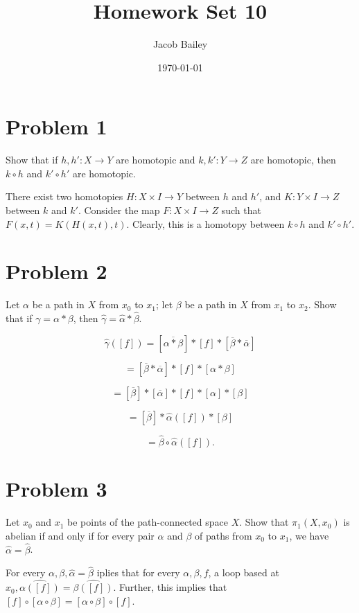 \documentclass[11pt]{article}
\author{Jacob Bailey}
\date{\today}
\title{Homework Set 10}
\begin{document}
\maketitle
\section{Problem 1}
\label{sec:orgf0c4a9f}
Show that if \(h, h': X\rightarrow Y\) are homotopic and \(k, k':Y\rightarrow Z\)
are homotopic, then \(k\circ h\) and \(k'\circ h'\) are homotopic.

There exist two homotopies \(H: X\times I\rightarrow Y\) between \(h\) and \(h'\), and
\(K:Y\times I\rightarrow Z\) between \(k\) and \(k'\). Consider the map \(F: X\times
I\rightarrow Z\) such that \(F(x,t) = K(H(x,t),t)\). Clearly, this is a homotopy
between \(k\circ h\) and \(k'\circ h'\). 

\section{Problem 2}
\label{sec:orgb931fb8}
Let \(\alpha\) be a path in \(X\) from \(x_0\) to \(x_1\); let \(\beta\) be a path in \(X\)
from \(x_1\) to \(x_2\). Show that if \(\gamma = \alpha * \beta\), then \(\hat{\gamma}
= \hat{\alpha}*\hat{\beta}\).

$$\hat{\gamma}([f]) = [\overline{\alpha *
\beta}]*[f]*[\overline{\beta}*\overline{\alpha}]$$

$$ = [\overline{\beta}*\overline{\alpha}]*[f]*[\alpha * \beta]$$

$$ = [\overline{\beta}]*[\overline{\alpha}]*[f]*[\alpha]*[\beta]$$

$$ = [\overline{\beta}]*\hat{\alpha}([f])*[\beta]$$

$$ = \hat{\beta}\circ \hat{\alpha}([f]).$$

\section{Problem 3}
\label{sec:org949202d}
Let \(x_0\) and \(x_1\) be points of the path-connected space \(X\). Show that
\(\pi_1(X, x_0)\) is abelian if and only if for every pair \(\alpha\) and \(\beta\) of
paths from \(x_0\) to \(x_1\), we have \(\hat{\alpha} = \hat{\beta}\).

For every \(\alpha, \beta, \hat{\alpha} = \hat{\beta}\) iplies that for every
\(\alpha, \beta, f\), a loop based at \(x_0, \hat{\alpha([f])} =
\hat{\beta([f])}\). Further, this implies that
\([f]\circ[\alpha\circ\beta] = [\alpha\circ\beta]\circ[f]\). 
\end{document}
